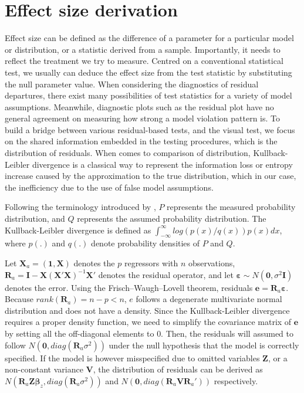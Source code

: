 \documentclass[]{interact}
\theoremstyle{plain}%
\theoremstyle{definition}
\theoremstyle{remark}
\begin{document}
\hypertarget{effect-size-derivation}{%
\section{Effect size derivation}\label{effect-size-derivation}}

Effect size can be defined as the difference of a parameter for a
particular model or distribution, or a statistic derived from a sample.
Importantly, it needs to reflect the treatment we try to measure.
Centred on a conventional statistical test, we usually can deduce the
effect size from the test statistic by substituting the null parameter
value. When considering the diagnostics of residual departures, there
exist many possibilities of test statistics for a variety of model
assumptions. Meanwhile, diagnostic plots such as the residual plot have
no general agreement on measuring how strong a model violation pattern
is. To build a bridge between various residual-based tests, and the
visual test, we focus on the shared information embedded in the testing
procedures, which is the distribution of residuals. When comes to
comparison of distribution, Kullback-Leibler divergence
\citep{kullback1951information} is a classical way to represent the
information loss or entropy increase caused by the approximation to the
true distribution, which in our case, the inefficiency due to the use of
false model assumptions.

Following the terminology introduced by \citet{kullback1951information},
\(P\) represents the measured probability distribution, and \(Q\)
represents the assumed probability distribution. The Kullback-Leibler
divergence is defined as
\(\int_{-\infty}^{\infty}log(p(x)/q(x))p(x)dx\), where \(p(.)\) and
\(q(.)\) denote probability densities of \(P\) and \(Q\).

Let \(\boldsymbol{X}_a = (\boldsymbol{1}, \boldsymbol{X})\) denotes the
\(p\) regressors with \(n\) observations,
\(\boldsymbol{R}_a = \boldsymbol{I} -\boldsymbol{X}(\boldsymbol{X}'\boldsymbol{X})^{-1}\boldsymbol{X}'\)
denotes the residual operator, and let
\(\boldsymbol{\varepsilon} \sim N(\boldsymbol{0},\sigma^2\boldsymbol{I})\)
denotes the error. Using the Frisch--Waugh--Lovell theorem, residuals
\(\boldsymbol{e} = \boldsymbol{R}_a\boldsymbol{\varepsilon}\). Because
\(rank(\boldsymbol{R}_a) = n - p < n\), \(e\) follows a degenerate
multivariate normal distribution and does not have a density. Since the
Kullback-Leibler divergence requires a proper density function, we need
to simplify the covariance matrix of \(\boldsymbol{e}\) by setting all
the off-diagonal elements to 0. Then, the residuals will assumed to
follow \(N(\boldsymbol{0}, diag(\boldsymbol{R}_a\sigma^2))\) under the
null hypothesis that the model is correctly specified. If the model is
however misspecified due to omitted variables \(\boldsymbol{Z}\), or a
non-constant variance \(\boldsymbol{V}\), the distribution of residuals
can be derived as
\(N(\boldsymbol{R}_a\boldsymbol{Z}\boldsymbol{\beta}_z, diag(\boldsymbol{R}_a\sigma^2))\)
and
\(N(\boldsymbol{0}, diag(\boldsymbol{R}_a\boldsymbol{V}\boldsymbol{R}_a'))\)
respectively.
\end{document}
